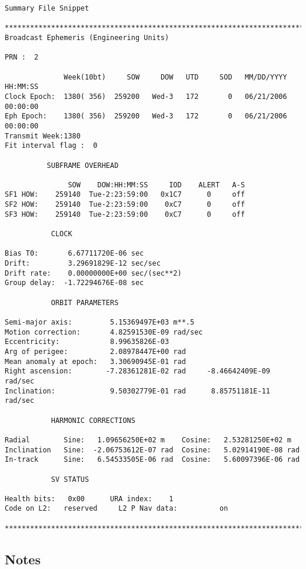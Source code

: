 \begin{\outputsize}
\begin{verbatim}
Summary File Snippet

****************************************************************************
Broadcast Ephemeris (Engineering Units)

PRN :  2

              Week(10bt)     SOW     DOW   UTD     SOD   MM/DD/YYYY   HH:MM:SS
Clock Epoch:  1380( 356)  259200   Wed-3   172       0   06/21/2006   00:00:00
Eph Epoch:    1380( 356)  259200   Wed-3   172       0   06/21/2006   00:00:00
Transmit Week:1380
Fit interval flag :  0

          SUBFRAME OVERHEAD

               SOW    DOW:HH:MM:SS     IOD    ALERT   A-S
SF1 HOW:    259140  Tue-2:23:59:00   0x1C7      0     off
SF2 HOW:    259140  Tue-2:23:59:00    0xC7      0     off
SF3 HOW:    259140  Tue-2:23:59:00    0xC7      0     off

           CLOCK

Bias T0:       6.67711720E-06 sec
Drift:         3.29691829E-12 sec/sec
Drift rate:    0.00000000E+00 sec/(sec**2)
Group delay:  -1.72294676E-08 sec

           ORBIT PARAMETERS

Semi-major axis:         5.15369497E+03 m**.5
Motion correction:       4.82591530E-09 rad/sec
Eccentricity:            8.99635826E-03
Arg of perigee:          2.08978447E+00 rad
Mean anomaly at epoch:   3.30690945E-01 rad
Right ascension:        -7.28361281E-02 rad     -8.46642409E-09 rad/sec
Inclination:             9.50302779E-01 rad      8.85751181E-11 rad/sec

           HARMONIC CORRECTIONS

Radial        Sine:   1.09656250E+02 m    Cosine:   2.53281250E+02 m
Inclination   Sine:  -2.06753612E-07 rad  Cosine:   5.02914190E-08 rad
In-track      Sine:   6.54533505E-06 rad  Cosine:   5.60097396E-06 rad

           SV STATUS

Health bits:   0x00      URA index:    1
Code on L2:   reserved     L2 P Nav data:          on

****************************************************************************
\end{verbatim}
\end{\outputsize}
\subsection{Notes}

%
